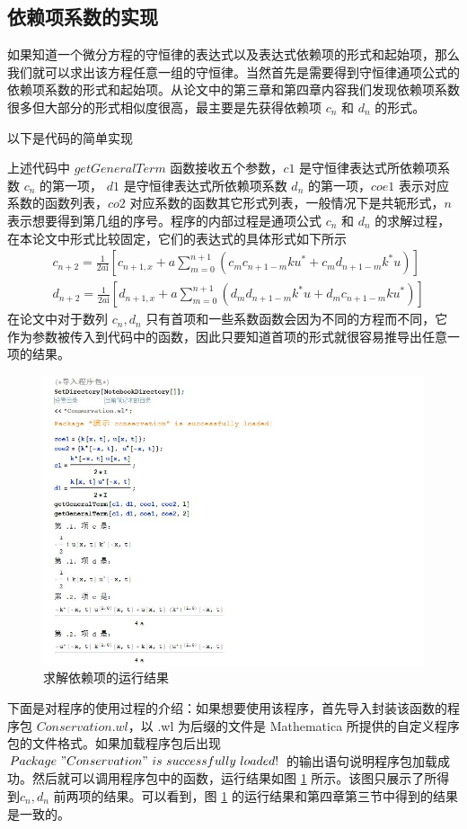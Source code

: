 \subsection{依赖项系数的实现}
如果知道一个微分方程的守恒律的表达式以及表达式依赖项的形式和起始项，那么我们就可以求出该方程任意一组的守恒律。当然首先是需要得到守恒律通项公式的依赖项系数的形式和起始项。从论文中的第三章和第四章内容我们发现依赖项系数很多但大部分的形式相似度很高，最主要是先获得依赖项 $c_n$ 和 $d_n$ 的形式。

以下是代码的简单实现

上述代码中 $getGeneralTerm$ 函数接收五个参数，$c1$ 是守恒律表达式所依赖项系数 $c_n$ 的第一项， $d1$ 是守恒律表达式所依赖项系数 $d_n$ 的第一项，$coe1$ 表示对应系数的函数列表，$co2$ 对应系数的函数其它形式列表，一般情况下是共轭形式，$n$ 表示想要得到第几组的序号。程序的内部过程是通项公式 $c_n$ 和 $d_n$ 的求解过程，在本论文中形式比较固定，它们的表达式的具体形式如下所示
\begin{align}
  & c_{n+2} = \frac{1}{2a\mathrm{i}} \left[c_{n+1,x} + a\sum_{m=0}^{n+1}(c_{m}c_{n+1-m}ku^{*} + c_{m}d_{n+1-m}k^{*}u)\right] \\
  & d_{n+2} = \frac{1}{2a\mathrm{i}} \left[ d_{n+1,x} + a\sum_{m=0}^{n+1}(d_{m}d_{n+1-m}k^{*}u + d_{m}c_{n+1-m}ku^{*}) \right]
\end{align}
在论文中对于数列 $c_n, d_n$ 只有首项和一些系数函数会因为不同的方程而不同，它作为参数被传入到代码中的函数，因此只要知道首项的形式就很容易推导出任意一项的结果。

\begin{figure}[!htp]
	\centering
	\includegraphics[width=0.97\linewidth]{getGeneralTerm.jpg}
	\caption{求解依赖项的运行结果}
	\label{picture-5-1}
\end{figure}
下面是对程序的使用过程的介绍：如果想要使用该程序，首先导入封装该函数的程序包 $Conservation.wl$，以 .wl 为后缀的文件是 Mathematica 所提供的自定义程序包的文件格式。如果加载程序包后出现 $Package \ "Conservation" \ is \ successfully \  loaded!$ 的输出语句说明程序包加载成功。然后就可以调用程序包中的函数，运行结果如图 \ref{picture-5-1} 所示。该图只展示了所得到$c_n, d_n$ 前两项的结果。可以看到，图 \ref{picture-5-1} 的运行结果和第四章第三节中得到的结果是一致的。


